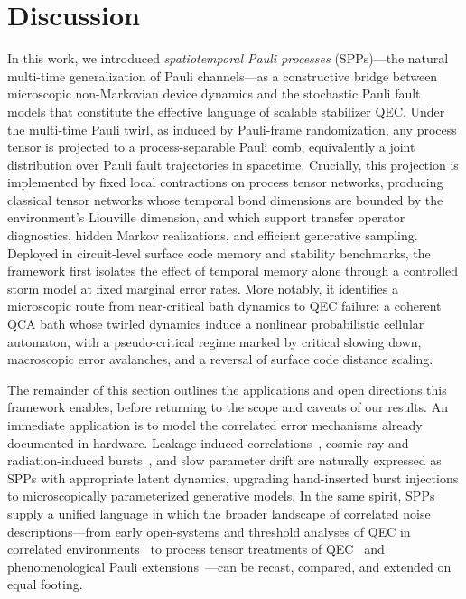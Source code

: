 \documentclass[
    aps,
    prx,
    reprint,
    superscriptaddress,
    longbibliography,
    nofootinbib,
    floatfix,
]{revtex4-2}
\begin{document}
\section{Discussion}\label{sec:discussion}
In this work, we introduced \emph{spatiotemporal Pauli processes} (SPPs)---the natural multi-time generalization of Pauli channels---as a constructive bridge between microscopic non-Markovian device dynamics and the stochastic Pauli fault models that constitute the effective language of scalable stabilizer QEC. Under the multi-time Pauli twirl, as induced by Pauli-frame randomization, any process tensor is projected to a process-separable Pauli comb, equivalently a joint distribution over Pauli fault trajectories in spacetime. Crucially, this projection is implemented by fixed local contractions on process tensor networks, producing classical tensor networks whose temporal bond dimensions are bounded by the environment's Liouville dimension, and which support transfer operator diagnostics, hidden Markov realizations, and efficient generative sampling. Deployed in circuit-level surface code memory and stability benchmarks, the framework first isolates the effect of temporal memory alone through a controlled storm model at fixed marginal error rates. More notably, it identifies a microscopic route from near-critical bath dynamics to QEC failure: a coherent QCA bath whose twirled dynamics induce a nonlinear probabilistic cellular automaton, with a pseudo-critical regime marked by critical slowing down, macroscopic error avalanches, and a reversal of surface code distance scaling.

The remainder of this section outlines the applications and open directions this framework enables, before returning to the scope and caveats of our results. An immediate application is to model the correlated error mechanisms already documented in hardware. Leakage-induced correlations~\cite{mcewenRemovingLeakageinducedCorrelated2021}, cosmic ray and radiation-induced bursts~\cite{mcewenResolvingCatastrophicError2022,harringtonSynchronousDetectionCosmic2025,bratrudMeasurementCorrelatedCharge2025}, and slow parameter drift are naturally expressed as SPPs with appropriate latent dynamics, upgrading hand-inserted burst injections to microscopically parameterized generative models. In the same spirit, SPPs supply a unified language in which the broader landscape of correlated noise descriptions---from early open-systems and threshold analyses of QEC in correlated environments~\cite{alickiInternalConsistencyFaulttolerant2006,klesseQuantumErrorCorrection2005,novaisSurfaceCodeThreshold2013,hutterBreakdownSurfacecodeError2014,terhalFaulttolerantQuantumComputation2005,ngFaulttolerantQuantumComputation2009,preskillSufficientConditionNoise2013} to process tensor treatments of QEC~\cite{tanggaraStrategicCodeUnified2024,kobayashiTensornetworkDecodersProcess2024} and phenomenological Pauli extensions~\cite{claderImpactCorrelationsHeavy2021,fkamDetrimentalNonMarkovianErrors2025}---can be recast, compared, and extended on equal footing.
\end{document}
